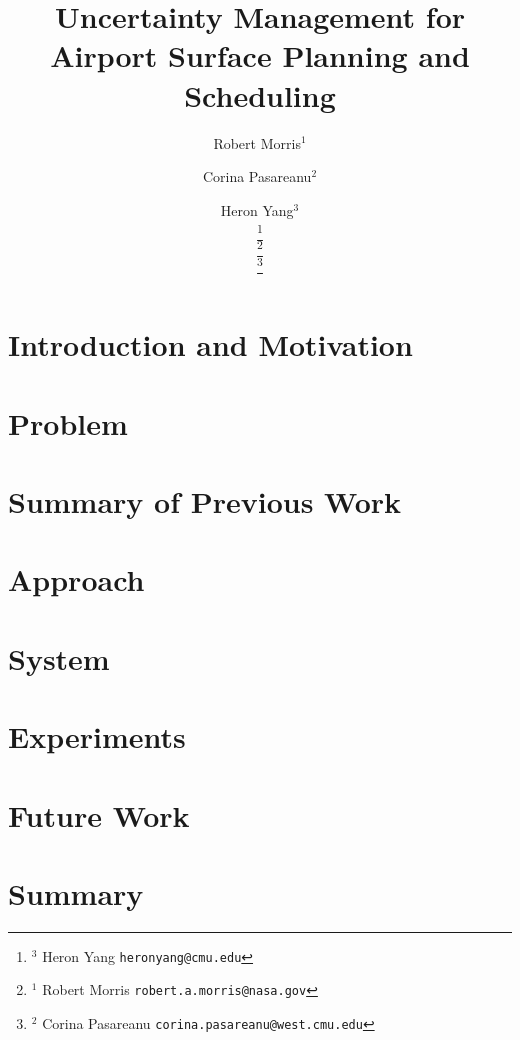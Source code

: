 \documentclass[letterpaper, 10 pt, conference]{ieeeconf}
\title{Uncertainty Management for Airport Surface Planning and Scheduling}
\author{Robert Morris$^{1}$ \and Corina Pasareanu$^{2}$ \and Heron Yang$^{3}$ \\ %
\thanks{$^{3}$ Heron Yang {\tt\small heronyang@cmu.edu}} \\
\thanks{$^{1}$ Robert Morris {\tt\small robert.a.morris@nasa.gov}} \\%
\thanks{$^{2}$ Corina Pasareanu {\tt\small corina.pasareanu@west.cmu.edu}}%
}
\begin{document}
\maketitle
\begin{abstract}
\end{abstract}
\section{Introduction and Motivation}
\section{Problem}
\section{Summary of Previous Work}
\section{Approach}
\section{System}
\section{Experiments}
\section{Future Work}
\section{Summary}


\end{document}
